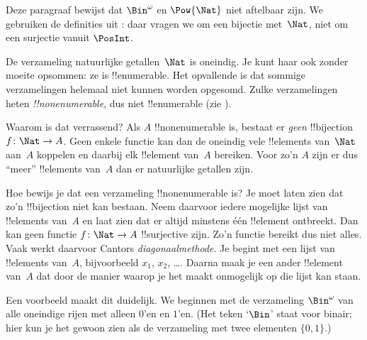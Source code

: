 \documentclass[../../../include/open-logic-section]{subfiles}
\begin{document}


\begin{editorial}
  Deze paragraaf bewijst dat $\Bin^\omega$ en $\Pow{\Nat}$ niet
  aftelbaar zijn. We gebruiken de definities uit
  : daar vragen we om een bijectie met~$\Nat$, niet
  om een surjectie vanuit $\PosInt$.
\end{editorial}

\begin{explain}
De verzameling natuurlijke getallen~$\Nat$ is oneindig. Je kunt haar
ook zonder moeite opsommen: ze is !!{enumerable}. Het opvallende is dat
sommige verzamelingen helemaal niet kunnen worden opgesomd. Zulke
verzamelingen heten \emph{!!{nonenumerable}}, dus niet !!{enumerable}
(zie ).

Waarom is dat verrassend? Als $A$ !!{nonenumerable} is, bestaat er
\emph{geen} !!{bijection} $f \colon \Nat \to A$. Geen enkele functie
kan dan de oneindig vele !!{element}s van~$\Nat$ aan~$A$ koppelen en
daarbij elk !!{element} van~$A$ bereiken. Voor zo'n $A$ zijn er dus
``meer'' !!{element}s van~$A$ dan er natuurlijke getallen zijn.

Hoe bewijs je dat een verzameling !!{nonenumerable} is? Je moet laten
zien dat zo'n !!{bijection} niet kan bestaan. Neem daarvoor iedere
mogelijke lijst van !!{element}s van~$A$ en laat zien dat er altijd
minstens één !!{element} ontbreekt. Dan kan geen functie
$f\colon \Nat \to A$ !!{surjective} zijn. Zo'n functie bereikt dus
niet alles. Vaak werkt daarvoor Cantors \emph{diagonaalmethode}. Je
begint met een lijst van !!{element}s van~$A$, bijvoorbeeld $x_1$,
$x_2$, \dots. Daarna maak je een ander !!{element} van~$A$ dat door de
manier waarop je het maakt onmogelijk op die lijst kan staan.

Een voorbeeld maakt dit duidelijk. We beginnen met de verzameling
$\Bin^\omega$ van alle oneindige rijen met alleen $0$'en en $1$'en. (Het
teken `$\Bin$' staat voor binair; hier kun je het gewoon zien als de
verzameling met twee elementen
$\{0,1\}$.)
\end{explain}
\end{document}
